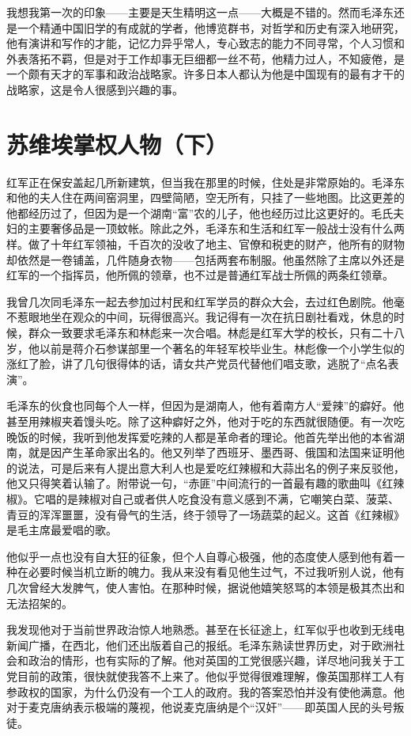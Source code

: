 \documentclass[10pt]{book}
\begin{document}
我想我第一次的印象——主要是天生精明这一点——大概是不错的。然而毛泽东还是一个精通中国旧学的有成就的学者，他博览群书，对哲学和历史有深入地研究，他有演讲和写作的才能，记忆力异乎常人，专心致志的能力不同寻常，个人习惯和外表落拓不羁，但是对于工作却事无巨细都一丝不苟，他精力过人，不知疲倦，是一个颇有天才的军事和政治战略家。许多日本人都认为他是中国现有的最有才干的战略家，这是令人很感到兴趣的事。



\section{苏维埃掌权人物（下）}

红军正在保安盖起几所新建筑，但当我在那里的时候，住处是非常原始的。毛泽东和他的夫人住在两间窑洞里，四壁简陋，空无所有，只挂了一些地图。比这更差的他都经历过了，但因为是一个湖南“富”农的儿子，他也经历过比这更好的。毛氏夫妇的主要奢侈品是一顶蚊帐。除此之外，毛泽东和生活和红军一般战士没有什么两样。做了十年红军领袖，千百次的没收了地主、官僚和税吏的财产，他所有的财物却依然是一卷铺盖，几件随身衣物——包括两套布制服。他虽然除了主席以外还是红军的一个指挥员，他所佩的领章，也不过是普通红军战士所佩的两条红领章。

我曾几次同毛泽东一起去参加过村民和红军学员的群众大会，去过红色剧院。他毫不惹眼地坐在观众的中间，玩得很高兴。我记得有一次在抗日剧社看戏，休息的时候，群众一致要求毛泽东和林彪来一次合唱。林彪是红军大学的校长，只有二十八岁，他以前是蒋介石参谋部里一个著名的年轻军校毕业生。林彪像一个小学生似的涨红了脸，讲了几句很得体的话，请女共产党员代替他们唱支歌，逃脱了“点名表演”。

毛泽东的伙食也同每个人一样，但因为是湖南人，他有着南方人“爱辣”的癖好。他甚至用辣椒夹着馒头吃。除了这种癖好之外，他对于吃的东西就很随便。有一次吃晚饭的时候，我听到他发挥爱吃辣的人都是革命者的理论。他首先举出他的本省湖南，就是因产生革命家出名的。他又列举了西班牙、墨西哥、俄国和法国来证明他的说法，可是后来有人提出意大利人也是爱吃红辣椒和大蒜出名的例子来反驳他，他又只得笑着认输了。附带说一句，“赤匪”中间流行的一首最有趣的歌曲叫《红辣椒》。它唱的是辣椒对自己或者供人吃食没有意义感到不满，它嘲笑白菜、菠菜、青豆的浑浑噩噩，没有骨气的生活，终于领导了一场蔬菜的起义。这首《红辣椒》是毛主席最爱唱的歌。

他似乎一点也没有自大狂的征象，但个人自尊心极强，他的态度使人感到他有着一种在必要时候当机立断的魄力。我从来没有看见他生过气，不过我听别人说，他有几次曾经大发脾气，使人害怕。在那种时候，据说他嬉笑怒骂的本领是极其杰出和无法招架的。

我发现他对于当前世界政治惊人地熟悉。甚至在长征途上，红军似乎也收到无线电新闻广播，在西北，他们还出版着自己的报纸。毛泽东熟读世界历史，对于欧洲社会和政治的情形，也有实际的了解。他对英国的工党很感兴趣，详尽地问我关于工党目前的政策，很快就使我答不上来了。他似乎觉得很难理解，像英国那样工人有参政权的国家，为什么仍没有一个工人的政府。我的答案恐怕并没有使他满意。他对于麦克唐纳表示极端的蔑视，他说麦克唐纳是个“汉奸”——即英国人民的头号叛徒。
\end{document}
